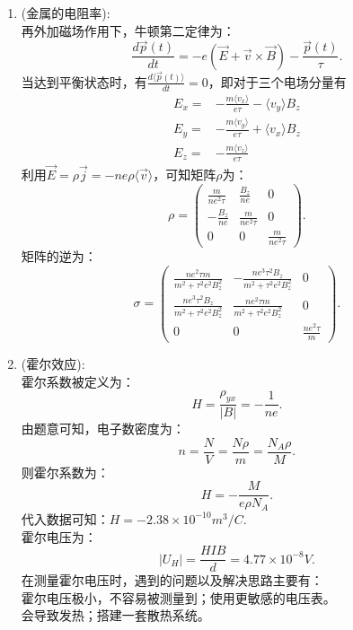 \documentclass[reqno,a4paper,12pt]{amsart}
\begin{document}
\begin{enumerate}
	\item (金属的电阻率): \\
	再外加磁场作用下，牛顿第二定律为：
	\[
		\frac{d\vec{p}(t)}{dt} = -e(\vec{E}+\vec{v} \times \vec{B}) - \frac{\vec{p}(t)}{\tau}.
	\]
	当达到平衡状态时，有$\frac{d\langle \vec{p}(t) \rangle}{dt} = 0$，即对于三个电场分量有
	\begin{equation*}
	\begin{aligned}
		E_x =& -\frac{m\langle v_x \rangle}{e\tau} - \langle v_y \rangle B_z \\
		E_y =& -\frac{m\langle v_y \rangle}{e\tau} + \langle v_x \rangle B_z \\
		E_z =& -\frac{m\langle v_z \rangle}{e\tau}
	\end{aligned}
	\end{equation*}
	利用$\vec{E} = \rho \vec{j} = -ne\rho \langle \vec{v} \rangle$，可知矩阵$\rho$为：
	\[
		\rho = \begin{pmatrix}
			\frac{m}{ne^2\tau} & \frac{B_z}{ne} & 0 \\
			-\frac{B_z}{ne} & \frac{m}{ne^2\tau} & 0 \\
			0 & 0 & \frac{m}{ne^2\tau}
		\end{pmatrix}.
	\]
	矩阵的逆为：
	\[
		\sigma = \begin{pmatrix}
			\frac{ne^2\tau m}{m^2+\tau^2e^2B_z^2} & -\frac{ne^3\tau^2B_z}{m^2+\tau^2e^2B_z^2} & 0 \\
			\frac{ne^3\tau^2B_z}{m^2+\tau^2e^2B_z^2} & \frac{ne^2\tau m}{m^2+\tau^2e^2B_z^2} & 0 \\
			0 & 0 & \frac{ne^2\tau}{m}
		\end{pmatrix}.
	\]
	
	\item (霍尔效应): \\
	霍尔系数被定义为：
	\[
		H = \frac{\rho_{yx}}{\vert B \vert} = -\frac{1}{ne}.
	\]
	由题意可知，电子数密度为：
	\[
		n = \frac{N}{V} = \frac{N\rho}{m} = \frac{N_A\rho}{M}.
	\]
	则霍尔系数为：
	\[
		H = -\frac{M}{e\rho N_A}.
	\]
	代入数据可知：$H = -2.38\times 10^{-10}m^3/C$. \\
	霍尔电压为：
	\[
		\vert U_H \vert = \frac{HIB}{d} = 4.77\times 10^{-8} V.
	\]
	在测量霍尔电压时，遇到的问题以及解决思路主要有：\\
	霍尔电压极小，不容易被测量到；使用更敏感的电压表。 \\
	会导致发热；搭建一套散热系统。
	

\end{enumerate}
\end{document}
